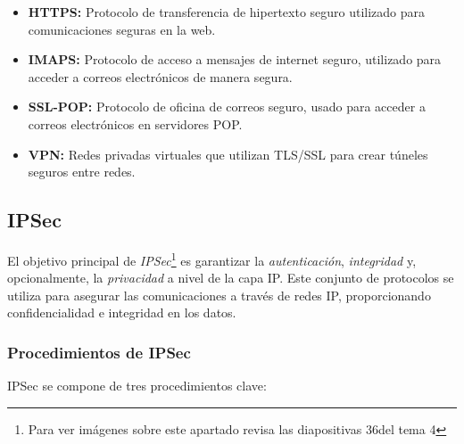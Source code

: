 \documentclass[a4paper,12pt]{article}
\begin{document}
\begin{itemize}
    \item \textbf{HTTPS:} Protocolo de transferencia de hipertexto seguro utilizado para comunicaciones seguras en la web.
    \item \textbf{IMAPS:} Protocolo de acceso a mensajes de internet seguro, utilizado para acceder a correos electrónicos de manera segura.
    \item \textbf{SSL-POP:} Protocolo de oficina de correos seguro, usado para acceder a correos electrónicos en servidores POP.
    \item \textbf{VPN:} Redes privadas virtuales que utilizan TLS/SSL para crear túneles seguros entre redes.
\end{itemize}




\subsection{IPSec}

El objetivo principal de \textit{IPSec}\footnote{Para ver imágenes sobre este apartado revisa las diapositivas 36del tema 4} es garantizar la \textit{autenticación}, \textit{integridad} y, opcionalmente, la \textit{privacidad} a nivel de la capa IP. Este conjunto de protocolos se utiliza para asegurar las comunicaciones a través de redes IP, proporcionando confidencialidad e integridad en los datos.

\subsubsection{Procedimientos de IPSec}

IPSec se compone de tres procedimientos clave:
\end{document}
